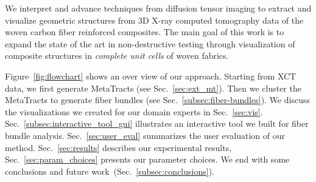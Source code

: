We interpret and advance techniques from diffusion tensor imaging to extract and visualize geometric structures from 3D X-ray computed tomography data of the woven carbon fiber reinforced composites. The main goal of this work is to expand the state of the art in non-destructive testing through visualization of composite structures in \textit{complete unit cells} of woven fabrics.

Figure~\ref{fig:flowchart} shows an over view of our approach.
Starting from XCT data, we first generate MetaTracts (see Sec.~\ref{sec:ext_mt}). Then we cluster the MetaTracts to generate fiber bundles (see Sec.~\ref{subsec:fiber-bundles}). We discuss the visualizations we created for our domain experts in Sec.~\ref{sec:vis}. Sec.~\ref{subsec:interactive_tool_gui} illustrates an interactive tool we  built for fiber bundle analysis. 
Sec.~\ref{sec:user_eval} summarizes the user evaluation of our method. Sec.~\ref{sec:results} describes our experimental results, Sec.~\ref{sec:param_choices} presents our parameter choices. We end with some conclusions and future work~(Sec.~\ref{subsec:conclusions}).  
